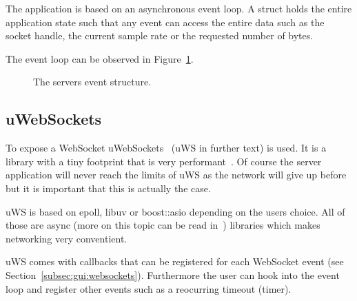 The application is based on an asynchronous event loop. A struct holds the entire application state such that any event can access the entire data such as the socket handle, the current sample rate or the requested number of bytes.

The event loop can be observed in Figure~\ref{fig:server:eventstructure}.

\begin{figure}
    \centering
    
    \caption[Server event structure]{%
        The servers event structure.%
    }
    \label{fig:server:eventstructure}
\end{figure}

\subsection{uWebSockets}
\label{subsec:server:uws}

To expose a WebSocket uWebSockets~\cite{uws:github} (uWS in further text) is used. It is a library with a tiny footprint that is very performant~\cite{uws:github}. Of course the server application will never reach the limits of uWS as the network will give up before but it is important that this is actually the case.

uWS is based on epoll, libuv or boost::asio depending on the users choice. All of those are async (more on this topic can be read in~\cite{uws:async}) libraries which makes networking very conventient.

uWS comes with callbacks that can be registered for each WebSocket event (see Section~\ref{subsec:gui:websockets}). Furthermore the user can hook into the event loop and register other events such as a reocurring timeout (timer).